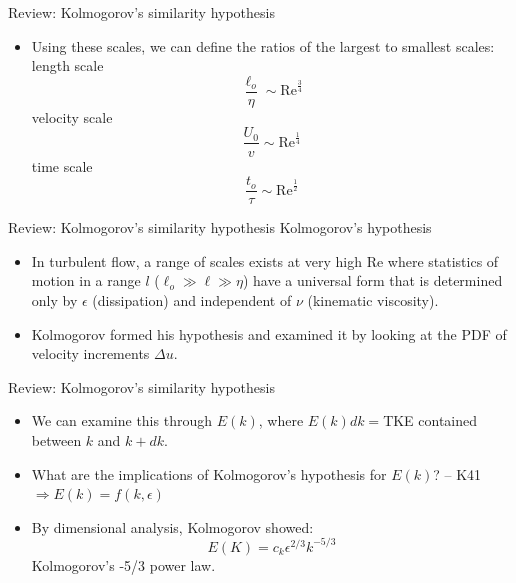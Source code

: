
\begin{frame}{Review: Kolmogorov's similarity hypothesis}

\begin{itemize}
	\item Using these scales, we can define the ratios of the largest to smallest scales:\newline\newline
	length scale $$\frac{\ell_o}{\eta} \sim \text{Re}^{\frac{3}{4}}$$
	velocity scale $$\frac{U_0}{v} \sim \text{Re}^{\frac{1}{4}}$$
	time scale $$\frac{t_o}{\tau} \sim \text{Re}^{\frac{1}{2}}$$
\end{itemize}

\end{frame}


\begin{frame}{Review: Kolmogorov's similarity hypothesis}
Kolmogorov's  hypothesis
\begin{itemize}
	\item In turbulent flow, a range of scales exists at very high Re where statistics of motion in a range $l$ ($\ell_o \gg \ell \gg \eta$) have a universal form that is determined only by $\epsilon$ (dissipation) and independent of $\nu$ (kinematic viscosity).
	\item Kolmogorov formed his hypothesis and examined it by looking at the PDF of velocity increments $\Delta u$.
\end{itemize}

\end{frame}


\begin{frame}{Review: Kolmogorov's similarity hypothesis}
\begin{itemize}
	\item We can examine this through $E(k)$, where $E(k)dk =$TKE contained between $k$ and $k+dk$.
	\item What are the implications of Kolmogorov’s hypothesis for $E(k)$? -- K41$\Rightarrow E(k) = f(k,\epsilon)$
	\item By dimensional analysis, Kolmogorov showed: $$E(K) = c_k \epsilon^{2/3}k^{-5/3}$$ Kolmogorov's -5/3 power law.
\end{itemize}

\end{frame}

